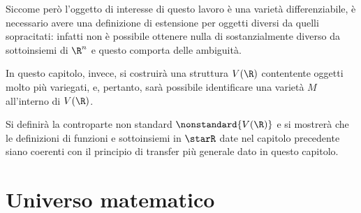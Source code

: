 Siccome però l'oggetto di interesse di questo lavoro è una varietà differenziabile, è necessario avere una definizione di estensione per oggetti diversi da quelli sopracitati: infatti non è possibile ottenere nulla di sostanzialmente diverso da sottoinsiemi di $ \R^{n} $ e questo comporta delle ambiguità.

In questo capitolo, invece, si costruirà una struttura $ V(\R) $ contentente oggetti molto più variegati, e, pertanto, sarà possibile identificare una varietà $ M $ all'interno di $ V(\R) $.

Si definirà la controparte non standard $ \nonstandard{V(\R)} $ e si mostrerà che le definizioni di funzioni e sottoinsiemi in $ \starR $ date nel capitolo precedente siano coerenti con il principio di transfer più generale dato in questo capitolo. 

\section{Universo matematico}


